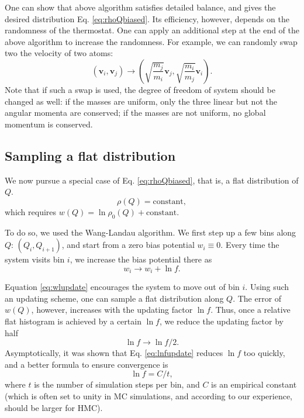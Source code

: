 \documentclass[notitlepage, preprint,superscriptaddress]{revtex4-1}
\newcommand{\vct}[1]{\mathbf{#1}}
\newcommand{\vv}{\vct{v}}
\begin{document}
One can show that above algorithm satisfies detailed balance,
and gives the desired distribution Eq. \eqref{eq:rhoQbiased}.
%
Its efficiency, however, depends on the randomness of the thermostat.
%
One can apply an additional step at the end of the above algorithm
to increase the randomness.
%
For example, we can randomly swap two the velocity of two atoms:
\[
  (\vv_i, \vv_j)
 \rightarrow
  \left(
     \sqrt{ \frac{ m_j } {m_i}  } \vv_j,
     \sqrt{ \frac{ m_i } {m_j}  } \vv_i
  \right).
\]
Note that if such a swap is used,
the degree of freedom of system should be changed as well:
if the masses are uniform,
only the three linear but not the angular momenta are conserved;
if the masses are not uniform,
no global momentum is conserved.



\subsection{Sampling a flat distribution}



We now pursue a special case of Eq. \eqref{eq:rhoQbiased},
that is, a flat distribution of $Q$.
\[
  \rho(Q) = \mbox{constant},
\]
which requires $w(Q) = \ln \rho_0(Q) + \mbox{constant}$.


To do so, we used the Wang-Landau algorithm\cite{
wang2001, wang2001pre}.
%
We first step up a few bins along $Q$:
$(Q_i, Q_{i+1})$,
and start from a zero bias potential
$w_i \equiv 0$.
%
Every time the system visits bin $i$,
we increase the bias potential there as\cite{
wang2001, wang2001pre}
%
\begin{equation}
w_i \rightarrow w_i + \ln f.
\label{eq:wlupdate}
\end{equation}



Equation \eqref{eq:wlupdate} encourages
the system to move out of bin $i$.
%
Using such an updating scheme,
one can sample a flat distribution along $Q$.
%
The error of $w(Q)$, however, increases with
the updating factor $\ln f$.
%
Thus, once a relative flat histogram is achieved
by a certain $\ln f$, we reduce the updating factor
by half\cite{
wang2001, wang2001pre}
%
\begin{equation}
  \ln f \rightarrow \ln f / 2.
\label{eq:lnfupdate}
\end{equation}
%
Asymptotically, it was shown that
Eq. \eqref{eq:lnfupdate} reduces $\ln f$ too quickly,
and a better formula to ensure convergence is\cite{
belardinelli2007, *belardinelli2008}
\begin{equation}
  \ln f = C / t,
\end{equation}
where $t$ is the number of simulation steps per bin,
and $C$ is an empirical constant
(which is often set to unity in MC simulations,
and according to our experience, should be larger for HMC).




\end{document}
